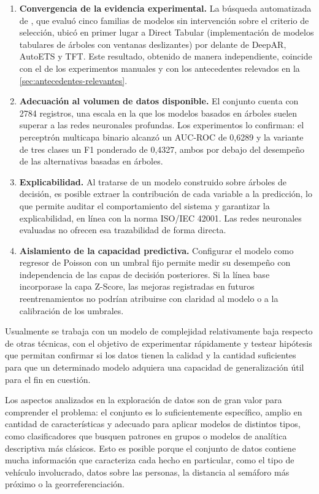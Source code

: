 \begin{enumerate}[label=\alph*), leftmargin=2em, itemsep=2pt]
  \item \textbf{Convergencia de la evidencia experimental.} La búsqueda automatizada de \autogluonts{}, que evaluó cinco familias de modelos sin intervención sobre el criterio de selección, ubicó en primer lugar a Direct Tabular (implementación de modelos tabulares de árboles con ventanas deslizantes) por delante de DeepAR, AutoETS y TFT. Este resultado, obtenido de manera independiente, coincide con el de los experimentos manuales y con los antecedentes relevados en la \cref{sec:antecedentes-relevantes}.
  \item \textbf{Adecuación al volumen de datos disponible.} El conjunto cuenta con 2784 registros, una escala en la que los modelos basados en árboles suelen superar a las redes neuronales profundas. Los experimentos lo confirman: el perceptrón multicapa binario alcanzó un AUC-ROC de 0,6289 y la variante de tres clases un F1 ponderado de 0,4327, ambos por debajo del desempeño de las alternativas basadas en árboles.
  \item \textbf{Explicabilidad.} Al tratarse de un modelo construido sobre árboles de decisión, es posible extraer la contribución de cada variable a la predicción, lo que permite auditar el comportamiento del sistema y garantizar la explicabilidad, en línea con la norma ISO/IEC 42001. Las redes neuronales evaluadas no ofrecen esa trazabilidad de forma directa.
  \item \textbf{Aislamiento de la capacidad predictiva.} Configurar el modelo como regresor de Poisson con un umbral fijo permite medir su desempeño con independencia de las capas de decisión posteriores. Si la línea base incorporase la capa Z-Score, las mejoras registradas en futuros reentrenamientos no podrían atribuirse con claridad al modelo o a la calibración de los umbrales.
\end{enumerate}

Usualmente se trabaja con un modelo de complejidad relativamente baja respecto de otras técnicas, con el objetivo de experimentar rápidamente y testear hipótesis que permitan confirmar si los datos tienen la calidad y la cantidad suficientes \parencite{zheng2018} para que un determinado modelo adquiera una capacidad de generalización útil para el fin en cuestión.

Los aspectos analizados en la exploración de datos son de gran valor para comprender el problema: el conjunto es lo suficientemente específico, amplio en cantidad de características y adecuado para aplicar modelos de distintos tipos, como clasificadores que busquen patrones en grupos o modelos de analítica descriptiva más clásicos. Esto es posible porque el conjunto de datos contiene mucha información que caracteriza cada hecho en particular, como el tipo de vehículo involucrado, datos sobre las personas, la distancia al semáforo más próximo o la georreferenciación.

